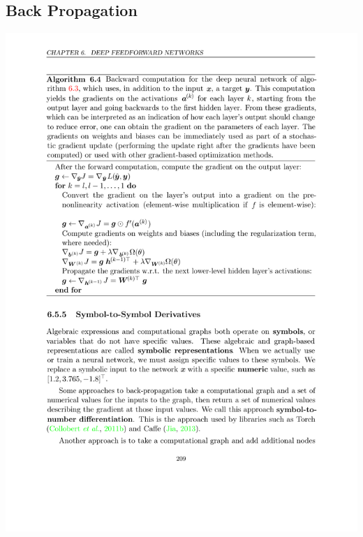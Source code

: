 \documentclass[12pt, a4paper]{article}
\begin{document}
\subsection{Back Propagation}
\includegraphics[width=\textwidth]{../imgs/Back_Propagation_of_MLP.pdf}
\end{document}
